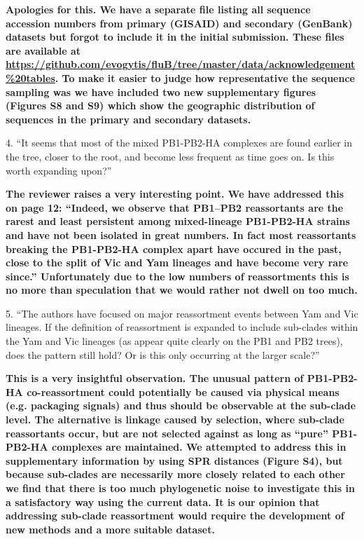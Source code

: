 \documentclass[11pt,oneside,letterpaper]{article}
\begin{document}
\textbf{Apologies for this. We have a separate file listing all sequence accession numbers from primary (GISAID) and secondary (GenBank) datasets but forgot to include it in the initial submission.
These files are available at \url{https://github.com/evogytis/fluB/tree/master/data/acknowledgement\%20tables}.
To make it easier to judge how representative the sequence sampling was we have included two new supplementary figures (Figures S8 and S9) which show the geographic distribution of sequences in the primary and secondary datasets.}

4. ``It seems that most of the mixed PB1-PB2-HA complexes are found earlier in the tree, closer to the root, and become less frequent as time goes on.  Is this worth expanding upon?''

\textbf{The reviewer raises a very interesting point. We have addressed this on page 12: 
``Indeed, we observe that PB1--PB2 reassortants are the rarest and least persistent among mixed-lineage PB1-PB2-HA strains and have not been isolated in great numbers.
In fact most reassortants breaking the PB1-PB2-HA complex apart have occured in the past, close to the split of Vic and Yam lineages and have become very rare since.''
Unfortunately due to the low numbers of reassortments this is no more than speculation that we would rather not dwell on too much.}

5. ``The authors have focused on major reassortment events between Yam and Vic lineages.  
If the definition of reassortment is expanded to include sub-clades within the Yam and Vic lineages (as appear quite clearly on the PB1 and PB2 trees), does the pattern still hold?  
Or is this only occurring at the larger scale?''

\textbf{This is a very insightful observation. The unusual pattern of PB1-PB2-HA co-reassortment could potentially be caused via physical means (e.g. packaging signals) and thus should be observable at the sub-clade level.
The alternative is linkage caused by selection, where sub-clade reassortants occur, but are not selected against as long as ``pure'' PB1-PB2-HA complexes are maintained.
We attempted to address this in supplementary information by using SPR distances (Figure S4), but because sub-clades are necessarily more closely related to each other we find that there is too much phylogenetic noise to investigate this in a satisfactory way using the current data.
It is our opinion that addressing sub-clade reassortment would require the development of new methods and a more suitable dataset.}
\end{document}
